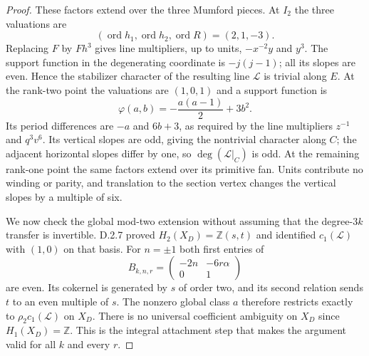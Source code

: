 \begin{proof}
These factors extend over the three Mumford pieces. At $I_2$
the three valuations are
\[
 (\operatorname{ord}h_1,\operatorname{ord}h_2,
   \operatorname{ord}R)=(2,1,-3).
\]
Replacing $F$ by $Fh^3$ gives line multipliers, up to units,
$-x^{-2}y$ and $y^3$. The support function in the degenerating
coordinate is $-j(j-1)$; all its slopes are even. Hence the
stabilizer character of the resulting line $\mathcal L$ is
trivial along $E$. At the rank-two point the valuations are
$(1,0,1)$ and a support function is
\[
 \varphi(a,b)=-\frac{a(a-1)}2+3b^2.
\]
Its period differences are $-a$ and $6b+3$, as required by
the line multipliers $z^{-1}$ and $q^3v^6$.
Its vertical slopes are odd, giving the nontrivial character
along $C$; the adjacent horizontal slopes differ by one, so
$\deg(\mathcal L|_C)$ is odd. At the remaining rank-one
point the same factors extend over its primitive fan.
Units contribute no winding or parity, and translation to the
section vertex changes the vertical slopes by a multiple of six.

We now check the global mod-two extension without assuming that
the degree-$3k$ transfer is invertible. D.2.7 proved
$H_2(X_D)=\mathbb Z(s,t)$ and identified
$c_1(\mathcal L)$ with $(1,0)$ on that basis.
For $n=\pm1$ both first entries of
\[
 B_{k,n,r}=\begin{pmatrix}-2n&-6r\alpha\\0&1\end{pmatrix}
\]
are even. Its cokernel is generated by $s$ of order two, and
its second relation sends $t$ to an even multiple of $s$.
The nonzero global class $a$ therefore restricts exactly to
$\rho_2c_1(\mathcal L)$ on $X_D$. There is no universal
coefficient ambiguity on $X_D$ since $H_1(X_D)=\mathbb Z$.
This is the integral attachment step that makes the argument
valid for all $k$ and every $r$.


\end{proof}
